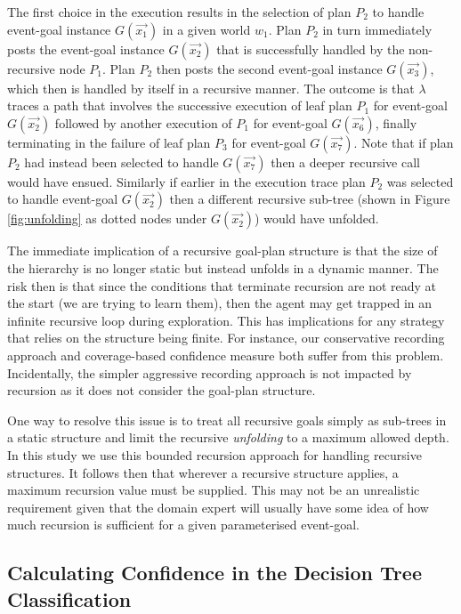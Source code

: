 The first choice in the execution results in the selection of plan $P_2$ to handle event-goal instance $G(\vec{x_1})$ in a given world $w_1$. Plan $P_2$ in turn immediately posts the event-goal instance $G(\vec{x_2})$ that is successfully handled by the non-recursive node $P_1$. Plan $P_2$ then posts the second event-goal instance $G(\vec{x_3})$, which then is handled by itself in a recursive manner.  The outcome is that $\lambda$ traces a path that involves the successive execution of leaf plan $P_1$ for event-goal $G(\vec{x_2})$ followed by another execution of $P_1$ for event-goal $G(\vec{x_6})$, finally terminating in the failure of leaf plan $P_3$ for event-goal $G(\vec{x_7})$. Note that if plan $P_2$ had instead been selected to handle $G(\vec{x_7})$ then a deeper recursive call would have ensued. Similarly if earlier in the execution trace plan $P_2$ was selected to handle event-goal $G(\vec{x_2})$ then a different recursive sub-tree (shown in Figure \ref{fig:unfolding} as dotted nodes under $G(\vec{x_2})$) would have unfolded.

The immediate implication of a recursive goal-plan structure is that the size of the hierarchy is no longer static but instead unfolds in a dynamic manner. The risk then is that since the conditions that terminate recursion are not ready at the start (we are trying to learn them), then the agent may get trapped in an infinite recursive loop during exploration. This has implications for any strategy that relies on the structure being finite. For instance, our conservative recording approach \cite{Airiau:IJAT:09} and coverage-based confidence measure \cite{Singh:AAMAS10} both suffer from this problem. Incidentally, the simpler aggressive recording approach \cite{Airiau:IJAT:09} is not impacted by recursion as it does not consider the goal-plan structure.

One way to resolve this issue is to treat all recursive goals simply as sub-trees in a static structure and limit the recursive \textit{unfolding}  to a maximum allowed depth. In this study we use this bounded recursion approach for handling recursive structures. It follows then that wherever a recursive structure applies, a maximum recursion value must be supplied. This may not be an unrealistic requirement given that the domain expert will usually have some idea of how much recursion is sufficient for a given parameterised event-goal. 

\subsection{Calculating Confidence in the Decision Tree Classification}

